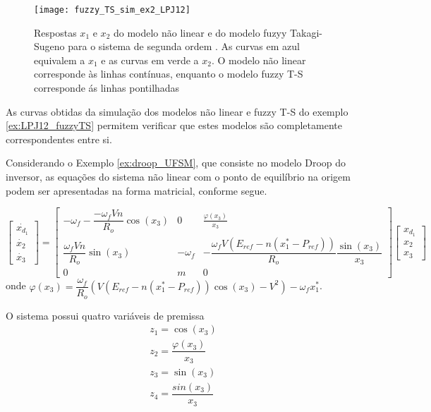 \begin{figure}[htbp]
	\centering
	\texttt{[image: fuzzy\_TS\_sim\_ex2\_LPJ12]}
	\caption{Respostas $x_1$ e $x_2$ do modelo não linear e do modelo fuzyy Takagi-Sugeno para o sistema de segunda ordem \cite{article:LPJ:2011}. As curvas em azul equivalem a $x_1$ e as curvas em verde a $x_2$. O modelo não linear corresponde às linhas contínuas, enquanto o modelo fuzzy T-S corresponde ás linhas pontilhadas}
	 \label{fig:sim_fuzyy_TS_ex2_LPJ12}
\end{figure}

As curvas obtidas da simulação dos modelos não linear e fuzzy T-S do exemplo \ref{ex:LPJ12_fuzzyTS} permitem verificar que estes modelos são completamente correspondentes entre si.

\begin{example}\label{ex:droop_UFSM_fuzzyTS}

Considerando o Exemplo \ref{ex:droop_UFSM}, que consiste no modelo Droop do inversor, as equações do sistema não linear com o ponto de equilíbrio na origem podem ser apresentadas na forma matricial, conforme segue.

\begin{equation}\label{eq:sist_droop_UFSM_mat}
\begin{bmatrix}\dot{x_{d_1}}\\\dot{x_2}\\\dot{x_3}\end{bmatrix} =\begin{bmatrix}-\omega_f - \dfrac{-\omega_fVn}{R_o}\cos(x_3)&0&\frac{\varphi(x_3)}{x_3}\\
\dfrac{\omega_fVn}{R_o}\sin(x_3)&-\omega_f&-\dfrac{\omega_fV(E_{ref}-n(x_1^*-P_{ref}))}{R_o}\dfrac{\sin(x_3)}{x_3}\\
0&m&0\end{bmatrix}\begin{bmatrix}x_{d_1}\\x_2\\x_3\end{bmatrix}
\end{equation}
onde $\varphi(x_3) = \dfrac{\omega_f}{R_o}(V(E_{ref}-n(x_1^* - P_{ref}))\cos(x_3) - V^2) - \omega_fx_1^*$.
\end{example}

O sistema possui quatro variáveis de premissa
\begin{equation*}
  \begin{gathered}
z_1 = \cos(x_3)\\
z_2 = \dfrac{\varphi(x_3)}{x_3}\\
z_3 = \sin(x_3)\\
z_4 = \dfrac{sin(x_3)}{x_3}
\end{gathered}
\end{equation*}

